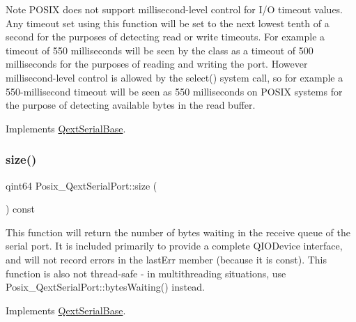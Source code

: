 \begin{DoxyNote}{Note}
P\+O\+S\+IX does not support millisecond-\/level control for I/O timeout values. Any timeout set using this function will be set to the next lowest tenth of a second for the purposes of detecting read or write timeouts. For example a timeout of 550 milliseconds will be seen by the class as a timeout of 500 milliseconds for the purposes of reading and writing the port. However millisecond-\/level control is allowed by the select() system call, so for example a 550-\/millisecond timeout will be seen as 550 milliseconds on P\+O\+S\+IX systems for the purpose of detecting available bytes in the read buffer. 
\end{DoxyNote}


Implements \mbox{\hyperlink{class_qext_serial_base}{Qext\+Serial\+Base}}.

\mbox{\label{class_posix___qext_serial_port_a6687bed8a582b144763eb11c4240dbe5}} 
\subsubsection{\texorpdfstring{size()}{size()}}
{\footnotesize\ttfamily qint64 Posix\+\_\+\+Qext\+Serial\+Port\+::size (\begin{DoxyParamCaption}{ }\end{DoxyParamCaption}) const\hspace{0.3cm}{\ttfamily [virtual]}}

This function will return the number of bytes waiting in the receive queue of the serial port. It is included primarily to provide a complete Q\+I\+O\+Device interface, and will not record errors in the last\+Err member (because it is const). This function is also not thread-\/safe -\/ in multithreading situations, use Posix\+\_\+\+Qext\+Serial\+Port\+::bytes\+Waiting() instead. 

Implements \mbox{\hyperlink{class_qext_serial_base}{Qext\+Serial\+Base}}.

\mbox{\label{class_posix___qext_serial_port_aa099923f1360a08c6b7072254fd056e6}} 

